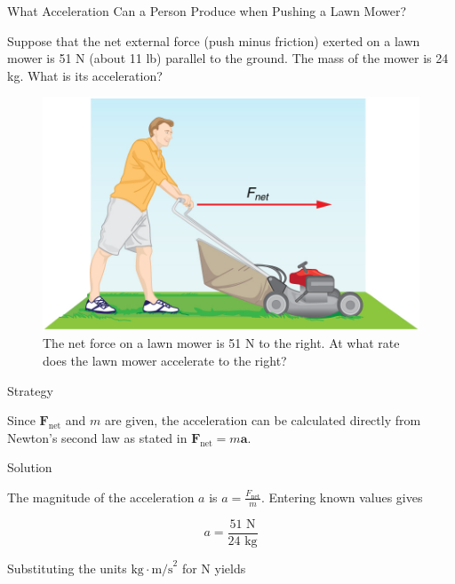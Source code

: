 \documentclass[
]{book}
\newenvironment{tinysection}{}{}
\begin{document}
\hypertarget{fs-id1916412}{}
What Acceleration Can a Person Produce when Pushing a Lawn Mower?

Suppose that the net external force (push minus friction) exerted on a
lawn mower is 51 N (about 11 lb) parallel to the ground. The mass of the
mower is 24 kg. What is its acceleration?

\begin{figure}
\hypertarget{fs-id2602810}{%
\centering
\includegraphics{images/Figure 04_03_03.jpg}
\caption{The net force on a lawn mower is 51 N to the right. At what rate does
the lawn mower accelerate to the
right?}\label{fs-id2602810}
}
\end{figure}

\begin{tinysection}

{Strategy}

\end{tinysection}

Since \(\textbf{F}_{\text{net}}{}\)\emph{} and
\(m{}\)\emph{} are given, the acceleration can be
calculated directly from Newton's second law as stated in
\({\textbf{F}_{\text{net}} = m\textbf{a}}{}\).

\begin{tinysection}

{Solution}

\end{tinysection}

The magnitude of the acceleration \(a{}\) is
\({a = \frac{F_{\text{net}}}{m}}{}\). Entering known values gives

\leavevmode\hypertarget{eip-id1171443383293}{}%
\[{a = \frac{\text{51\ N}}{\text{24\ kg}}}{}\]

Substituting the units \({\text{kg} \cdot \text{m/s}^{2}}{}\) for N yields
\end{document}
